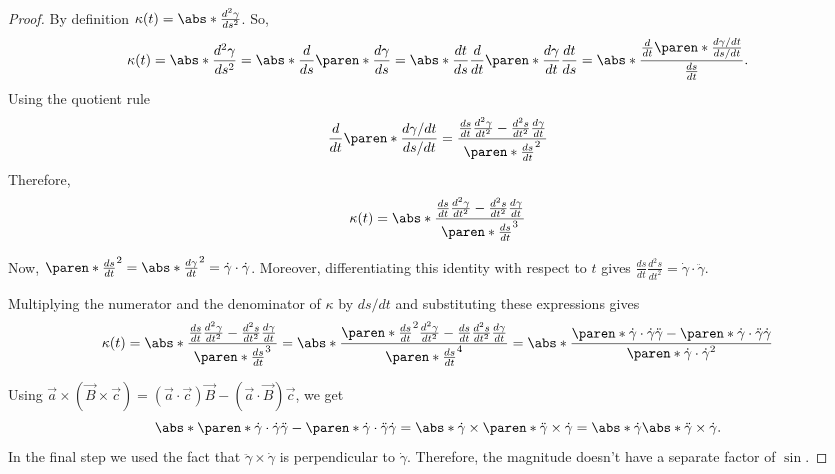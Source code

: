 \documentclass[11pt]{penrose}
\newcommand{\vB}{\vec{B}}
\begin{document}
\begin{proof}
    By definition $\kappa(t) = \abs*{ \frac{d^2 \gamma}{ds^2} }$. So,
    \begin{equation}
        \kappa(t)
        = \abs*{ \frac{d^2 \gamma}{ds^2} }
        = \abs*{ \frac{d}{ds} \paren*{\frac{d\gamma}{ds}} }
        = \abs*{ \frac{dt}{ds} \frac{d}{dt} \paren*{\frac{d\gamma}{dt} \frac{dt}{ds}} }
        = \abs*{ \frac{\frac{d}{dt} \paren*{ \frac{ d\gamma/dt }{ ds/dt } }}{\frac{ds}{dt}} }.
    \end{equation}
    Using the quotient rule
    \begin{equation}
        \frac{d}{dt} \paren*{ \frac{ d\gamma/dt }{ ds/dt } }
        = \dfrac{ \frac{ds}{dt} \frac{d^2 \gamma}{dt^2} - \frac{d^2 s}{dt^2} \frac{d\gamma}{dt} }{ \paren*{\frac{ds}{dt}}^2 }
    \end{equation}
    Therefore,
    \begin{equation}
        \kappa(t)
        = \abs*{ \dfrac{ \frac{ds}{dt} \frac{d^2 \gamma}{dt^2} - \frac{d^2 s}{dt^2} \frac{d\gamma}{dt} }{ \paren*{\frac{ds}{dt}}^3 } }
    \end{equation}

    Now, $\paren*{\frac{ds}{dt}}^2 = \abs*{ \frac{d\gamma}{dt} }^2 = \dot{\gamma} \cdot \dot{\gamma}$. Moreover, differentiating this identity with respect to $t$ gives $\frac{ds}{dt} \frac{d^2 s}{dt^2} = \dot{\gamma} \cdot \ddot{\gamma}$.

    Multiplying the numerator and the denominator of $\kappa$ by $ds/dt$ and substituting these expressions gives
    \begin{equation}
        \kappa(t)
        = \abs*{ \dfrac{ \frac{ds}{dt} \frac{d^2 \gamma}{dt^2} - \frac{d^2 s}{dt^2} \frac{d\gamma}{dt} }{ \paren*{\frac{ds}{dt}}^3 } }
        = \abs*{ \dfrac{ \paren*{\frac{ds}{dt}}^2 \frac{d^2 \gamma}{dt^2} - \frac{ds}{dt} \frac{d^2 s}{dt^2} \frac{d\gamma}{dt} }{ \paren*{\frac{ds}{dt}}^4 } }
        = \abs*{ \dfrac{ \paren*{\dot{\gamma} \cdot \dot{\gamma}} \ddot{\gamma} - \paren*{\dot{\gamma} \cdot \ddot{\gamma}} \dot{\gamma} }{ \paren*{\dot{\gamma} \cdot \dot{\gamma}}^2 } }
    \end{equation}

    Using $\vec{a} \times (\vB \times \vec{c}) = (\vec{a} \cdot \vec{c})\vB - (\vec{a} \cdot \vB)\vec{c}$, we get
    \begin{equation}
        \abs*{ \paren*{\dot{\gamma} \cdot \dot{\gamma}} \ddot{\gamma} - \paren*{\dot{\gamma} \cdot \ddot{\gamma}} \dot{\gamma} }
        = \abs*{ \dot{\gamma} \times \paren*{\ddot{\gamma} \times \dot{\gamma}} }
        = \abs*{ \dot{\gamma} } \abs*{ \ddot{\gamma} \times \dot{\gamma} }.
    \end{equation}
    In the final step we used the fact that $\ddot{\gamma} \times \dot{\gamma}$ is perpendicular to $\dot{\gamma}$. Therefore, the magnitude doesn't have a separate factor of $\sin$.


\end{proof}
\end{document}
